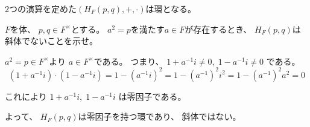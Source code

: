\documentclass[12pt,b5paper]{ltjsarticle}
\begin{document}
2つの演算を定めた$(H_{F}(p,q),+,\cdot)$は環となる。


\hrulefill

$F$を体、
$p,q \in F^{\times}$とする。
$a^{2}=p$を満たす$a\in F$が存在するとき、
$H_{F}(p,q)$は斜体でないことを示せ。

\dotfill

$a^{2}=p \in F^{\times}$より
$a\in F^{\times}$である。
つまり、
$1+a^{-1}i \ne 0,\; 1-a^{-1}i \ne 0$
である。
\begin{equation}
 (1+a^{-1}i)\cdot (1-a^{-1}i)
  = 1 - (a^{-1}i)^{2}
  = 1 - (a^{-1})^{2}i^{2}
  = 1 - (a^{-1})^{2}a^{2}
  = 0
\end{equation}

これにより
$1+a^{-1}i,\; 1-a^{-1}i$
は零因子である。

よって、
$H_{F}(p,q)$は零因子を持つ環であり、
斜体ではない。

\hrulefill
\end{document}
